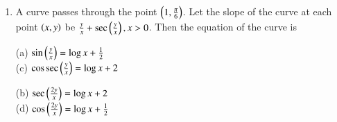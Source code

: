 \documentclass[journal,12pt,twocolumn]{IEEEtran}
\theoremstyle{remark}
\begin{document}
\begin{enumerate}
\begin{multicols}{2}
(b) $ y\brak{\frac{\pi}{3}} = \frac{\pi^2}{9} $  \\(d) $ y\brak{\frac{\pi}{3}} = \frac{4\pi}{3} + \frac{2\pi^2}{3\sqrt{3}} $
\end{multicols}

\item A curve passes through the point $ \left(1,\frac{\pi}{6}\right) $. Let the slope of the curve at each point $ \left(x, y\right) $ be $ \frac{y}{x} + \sec\left(\frac{y}{x}\right), x > 0 $. Then the equation of the curve is 

\begin{multicols}{2}
(a) $ \sin\left(\frac{y}{x}\right) = \log x + \frac{1}{2} $ \\ (c) $\cos\sec\left(\frac{y}{x}\right) = \log x + 2 $
\columnbreak

(b) $\sec\left(\frac{2y}{x}\right) = \log x + 2$ \\(d) $ \cos\left(\frac{2y}{x}\right) = \log x + \frac{1}{2} $
\end{multicols}
\end{enumerate}
\end{document}
